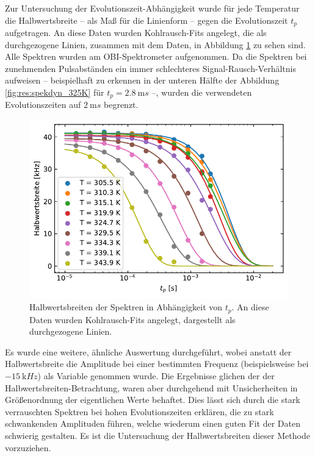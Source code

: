 Zur Untersuchung der Evo\-lu\-tions\-zeit-Ab\-häng\-ig\-keit wurde für jede Temperatur die Halbwertsbreite -- als Maß für die Linienform -- gegen die Evolutionszeit $t_p$ aufgetragen. An diese Daten wurden Kohlrausch-Fits angelegt, die als durchgezogene Linien, zusammen mit dem Daten, in Abbildung \ref{fig:res:spekdyn_fits} zu sehen sind. Alle Spektren wurden am OBI-Spektrometer aufgenommen. Da die Spektren bei zunehmenden Pulsabständen ein immer schlechteres Sig\-nal-Rausch-Ver\-hält\-nis aufweisen -- beispielhaft zu erkennen in der unteren Hälfte der Abbildung \ref{fig:res:spekdyn_325K} für $t_p = \SI{2.8}{\milli s}$ --, wurden die verwendeten Evolutionszeiten auf $\SI{2}{\milli s}$ begrenzt. 
\begin{figure}
	\begin{center}
		\includegraphics[width=.9\textwidth]{graphics/plot/spekdyn_fits2.pdf}
	\end{center}
	\caption{Halbwertsbreiten der Spektren in Abhängigkeit von $t_p$. An diese Daten wurden Kohlrausch-Fits angelegt, dargestellt als durchgezogene Linien.} \label{fig:res:spekdyn_fits}
\end{figure}

Es wurde eine weitere, ähnliche Auswertung durchgeführt, wobei anstatt der Halbwertsbreite die Amplitude bei einer bestimmten Frequenz (beispielsweise bei $\SI{-15}{\kilo Hz}$) als Variable genommen wurde. Die Ergebnisse glichen der der Halbwertsbreiten-Betrachtung, waren aber durchgehend mit Unsicherheiten in Größenordnung der eigentlichen Werte behaftet. Dies lässt sich durch die stark verrauschten Spektren bei hohen Evolutionszeiten erklären, die zu stark schwankenden Amplituden führen, welche wiederum einen guten Fit der Daten schwierig gestalten. Es ist die Untersuchung der Halbwertsbreiten dieser Methode vorzuziehen.



